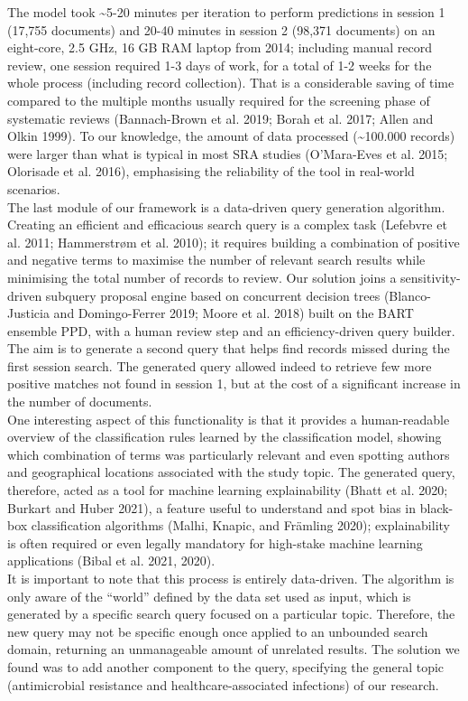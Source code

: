 \documentclass{article}
\begin{document}
The model took \textasciitilde5-20 minutes per iteration to perform
predictions in session 1 (17,755 documents) and 20-40 minutes in session
2 (98,371 documents) on an eight-core, 2.5 GHz, 16 GB RAM laptop from
2014; including manual record review, one session required 1-3 days of
work, for a total of 1-2 weeks for the whole process (including record
collection). That is a considerable saving of time compared to the
multiple months usually required for the screening phase of systematic
reviews (Bannach-Brown et al. 2019; Borah et al. 2017; Allen and Olkin
1999). To our knowledge, the amount of data processed
(\textasciitilde100.000 records) were larger than what is typical in
most SRA studies (O'Mara-Eves et al. 2015; Olorisade et al. 2016),
emphasising the reliability of the tool in real-world scenarios.\\

The last module of our framework is a data-driven query generation
algorithm. Creating an efficient and efficacious search query is a
complex task (Lefebvre et al. 2011; Hammerstrøm et al. 2010); it
requires building a combination of positive and negative terms to
maximise the number of relevant search results while minimising the
total number of records to review. Our solution joins a
sensitivity-driven subquery proposal engine based on concurrent decision
trees (Blanco-Justicia and Domingo-Ferrer 2019; Moore et al. 2018) built
on the BART ensemble PPD, with a human review step and an
efficiency-driven query builder. The aim is to generate a second query
that helps find records missed during the first session search. The
generated query allowed indeed to retrieve few more positive matches not
found in session 1, but at the cost of a significant increase in the
number of documents.\\
One interesting aspect of this functionality is that it provides a
human-readable overview of the classification rules learned by the
classification model, showing which combination of terms was
particularly relevant and even spotting authors and geographical
locations associated with the study topic. The generated query,
therefore, acted as a tool for machine learning explainability (Bhatt et
al. 2020; Burkart and Huber 2021), a feature useful to understand and
spot bias in black-box classification algorithms (Malhi, Knapic, and
Främling 2020); explainability is often required or even legally
mandatory for high-stake machine learning applications (Bibal et al.
2021, 2020).\\
It is important to note that this process is entirely data-driven. The
algorithm is only aware of the ``world'' defined by the data set used as
input, which is generated by a specific search query focused on a
particular topic. Therefore, the new query may not be specific enough
once applied to an unbounded search domain, returning an unmanageable
amount of unrelated results. The solution we found was to add another
component to the query, specifying the general topic (antimicrobial
resistance and healthcare-associated infections) of our research.\\
\end{document}

